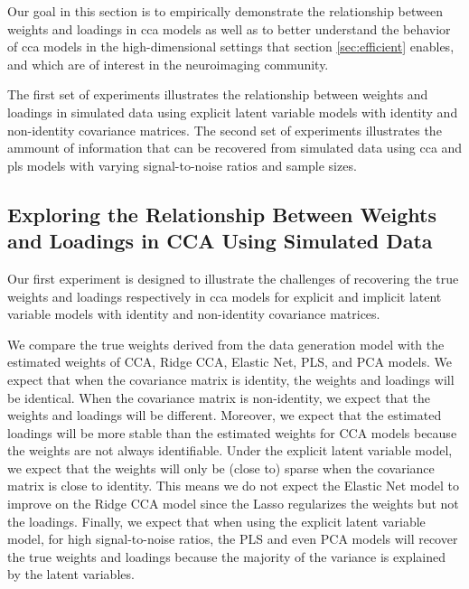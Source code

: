 Our goal in this section is to empirically demonstrate the relationship between weights and \gls{loadings} in \acrshort{cca} models as well as to better understand the behavior of \acrshort{cca} models in the high-dimensional settings that section \ref{sec:efficient} enables, and which are of interest in the neuroimaging community.

The first set of experiments illustrates the relationship between weights and \gls{loadings} in simulated data using explicit latent variable models with identity and non-identity covariance matrices.
The second set of experiments illustrates the ammount of information that can be recovered from simulated data using \acrshort{cca} and \acrshort{pls} models with varying signal-to-noise ratios and sample sizes.

\subsection{Exploring the Relationship Between Weights and Loadings in CCA Using Simulated Data}

Our first experiment is designed to illustrate the challenges of recovering the true weights and \gls{loadings} respectively in \acrshort{cca} models for explicit and implicit latent variable models with identity and non-identity covariance matrices.

We compare the true weights derived from the data generation model with the estimated weights of CCA, Ridge CCA, Elastic Net, PLS, and PCA models.
We expect that when the covariance matrix is identity, the weights and \gls{loadings} will be identical.
When the covariance matrix is non-identity, we expect that the weights and \gls{loadings} will be different.
Moreover, we expect that the estimated loadings will be more stable than the estimated weights for CCA models because the weights are not always identifiable.
Under the explicit latent variable model, we expect that the weights will only be (close to) sparse when the covariance matrix is close to identity.
This means we do not expect the Elastic Net model to improve on the Ridge CCA model since the Lasso regularizes the weights but not the \gls{loadings}.
Finally, we expect that when using the explicit latent variable model, for high signal-to-noise ratios, the PLS and even PCA models will recover the true weights and \gls{loadings} because the majority of the variance is explained by the latent variables.


